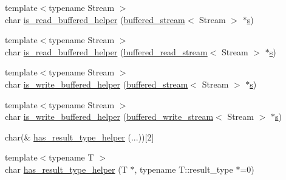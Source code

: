 \begin{DoxyCompactItemize}
\item 
{\footnotesize template$<$typename Stream $>$ }\\char \hyperlink{namespaceasio_1_1detail_a06bb6a279706836ed9736cef6373eb27}{is\+\_\+read\+\_\+buffered\+\_\+helper} (\hyperlink{classasio_1_1buffered__stream}{buffered\+\_\+stream}$<$ Stream $>$ $\ast$\hyperlink{group__async__connect_ga31ab74b9ea6c77932dddd016cfc7920a}{s})
\item 
{\footnotesize template$<$typename Stream $>$ }\\char \hyperlink{namespaceasio_1_1detail_af7f9e17e9b385c371a34475c958ff26d}{is\+\_\+read\+\_\+buffered\+\_\+helper} (\hyperlink{classasio_1_1buffered__read__stream}{buffered\+\_\+read\+\_\+stream}$<$ Stream $>$ $\ast$\hyperlink{group__async__connect_ga31ab74b9ea6c77932dddd016cfc7920a}{s})
\item 
{\footnotesize template$<$typename Stream $>$ }\\char \hyperlink{namespaceasio_1_1detail_a01456a831b66f23c07977b8c23078b46}{is\+\_\+write\+\_\+buffered\+\_\+helper} (\hyperlink{classasio_1_1buffered__stream}{buffered\+\_\+stream}$<$ Stream $>$ $\ast$\hyperlink{group__async__connect_ga31ab74b9ea6c77932dddd016cfc7920a}{s})
\item 
{\footnotesize template$<$typename Stream $>$ }\\char \hyperlink{namespaceasio_1_1detail_aa4d9e03b23daeecc6f56d763ec75908d}{is\+\_\+write\+\_\+buffered\+\_\+helper} (\hyperlink{classasio_1_1buffered__write__stream}{buffered\+\_\+write\+\_\+stream}$<$ Stream $>$ $\ast$\hyperlink{group__async__connect_ga31ab74b9ea6c77932dddd016cfc7920a}{s})
\item 
char(\& \hyperlink{namespaceasio_1_1detail_ab7c825c67c9e62866d305af68bf0643c}{has\+\_\+result\+\_\+type\+\_\+helper} (...))\mbox{[}2\mbox{]}
\item 
{\footnotesize template$<$typename T $>$ }\\char \hyperlink{namespaceasio_1_1detail_a73ace2367ad6765599cc755cee7ca779}{has\+\_\+result\+\_\+type\+\_\+helper} (T $\ast$, typename T\+::result\+\_\+type $\ast$=0)
\end{DoxyCompactItemize}
